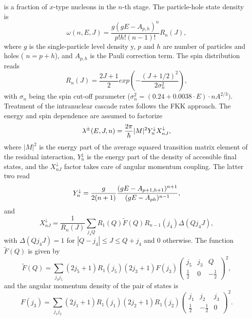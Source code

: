is a fraction of $x$-type nucleons in the $n$-th stage. The particle-hole
state density is
\begin{equation}
\omega(n,E,J)=\frac{g(gE-A_{p,h})^{n}}{p!h!(n-1)!}R_{n}(J),
\end{equation}
\noindent where $g$ is the single-particle level density%
y, $p$ and $h$ are number of particles and holes (%
$n=p+h$), and $A_{p,h}$ is the Pauli correction term. The spin distribution
reads
\begin{equation}
R_{n}(J)=%
\frac{2J+1}{2}exp\left(-\frac{(J+1/2)^{2}}{2\sigma_{n}^{2}}\right),
\end{equation}
with $\sigma_{n}$ being the spin cut-off parameter ($%
\sigma_{n}^{2}=(0.24+0.0038\cdot E)\cdot nA^{2/3}).$ Treatment of the
intranuclear cascade rates follows the FKK \cite{FKK} approach. The energy
and spin dependence are assumed to factorize
\begin{equation}
\lambda^{\pm}(E,J,n)=\frac{2\pi}{\hbar}|M|^{2}Y_{n}^{\downarrow}X_{nJ}^{%
\downarrow},
\end{equation}
\noindent where $|M|^{2}$ is the energy part of the average squared
transition matrix element of the residual interaction, $Y_{n}^{\downarrow}$
is the energy part of the density of accessible final states, and the $%
X_{nJ}^{\downarrow}$ factor takes care of angular momentum coupling. The
latter two read
\begin{equation}
Y_{n}^{\downarrow}=\frac{g}{2(n+1)}\frac{(gE-A_{p+1,h+1})^{n+1}}{%
(gE-A_{ph})^{n-1}},
\end{equation}
and
\begin{equation}
X_{nJ}^{\downarrow}=\frac{1}{R_{n}(J)}\sum_{j_{4}Q}R_{1}(Q)\widetilde{F}%
(Q)R_{n-1}(j_{4})\Delta(Qj_{4}J),
\end{equation}
with $\Delta(Qj_{4}J)=1$ for $|Q-j_{4}|\leq J\leq Q+j_{4}$ and 0 otherwise.
The function $\widetilde{F}(Q)$ is given by
\begin{equation}
\widetilde{F}(Q)=\sum_{j_{3}j_{5}}(2j_{5}+1)R_{1}(j_{5})(2j_{3}+1)F(j_{3})%
\left(%
\begin{array}{ccc}
j_{5} & j_{3} & Q \\
\frac{1}{2} & 0 & -\frac{1}{2}%
\end{array}%
\right)^{2},
\end{equation}
and the angular momentum density of the pair of states is
\begin{equation}
F(j_{3})=\sum_{j_{1}j_{2}}(2j_{1}+1)R_{1}(j_{1})(2j_{2}+1)R_{1}(j_{2})\left(%
\begin{array}{ccc}
j_{1} & j_{2} & j_{3} \\
\frac{1}{2} & -\frac{1}{2} & 0%
\end{array}%
\right)^{2}.
\end{equation}
